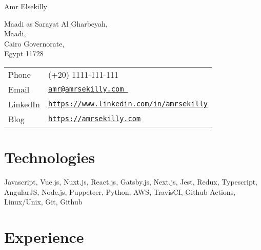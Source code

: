 \documentclass[letterpaper]{article}
\def\name{Amr Elsekilly}
\renewenvironment{itemize}{
  \begin{list}{}{
    \setlength{\leftmargin}{1.5em}
  }
}{
  \end{list}
}
\begin{document}
{\huge \name}

\vspace{0.25in}

\begin{minipage}{0.45\linewidth}
  Maadi as Sarayat Al Gharbeyah, \\
  Maadi,\\
  Cairo Governorate, \\
  Egypt 11728
\end{minipage}
\begin{minipage}{0.45\linewidth}
  \begin{tabular}{ll}
    Phone & (+20) 1111-111-111 \\
    Email & \href{ mailto:amr@amrsekilly.com }{\tt amr@amrsekilly.com } \\
    LinkedIn & \href{https://www.linkedin.com/in/amrsekilly}{\tt https://www.linkedin.com/in/amrsekilly} \\
    Blog & \href{https://amrsekilly.com}{\tt https://amrsekilly.com} \\
  \end{tabular}
\end{minipage}

\section*{Technologies}

\begin{itemize}
  \item Javascript, Vue.js, Nuxt.js, React.js, Gatsby.js, Next.js, Jest, Redux, Typescript, AngularJS, Node.js, Puppeteer, Python, AWS, TravisCI, Github Actions, Linux/Unix, Git, Github
\end{itemize}

\section*{Experience}
\end{document}
